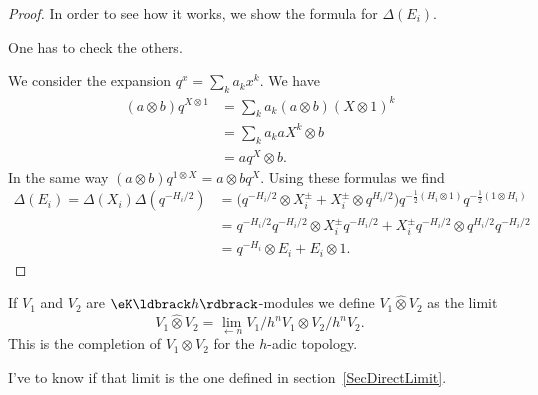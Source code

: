 \begin{proof}
	In order to see how it works, we show the formula for \( \Delta(E_i)\).
	\begin{probleme}
		One has to check the others.
	\end{probleme}
	We consider the expansion \( q^{x}=\sum_ka_kx^k\). We have
	\begin{subequations}
		\begin{align}
			(a\otimes b)q^{X\otimes 1} & =\sum_ka_k(a\otimes b)(X\otimes 1)^k \\
			                           & =\sum_k a_k aX^k\otimes b            \\
			                           & =aq^X\otimes b.
		\end{align}
	\end{subequations}
	In the same way \( (a\otimes b)q^{1\otimes X}=a\otimes bq^{X}\). Using these formulas we find
	\begin{subequations}
		\begin{align}
			\Delta(E_i)=\Delta(X_i)\Delta(q^{-H_i/2}) & =\big( q^{-H_i/2}\otimes X_i^{\pm}+X_i^{\pm}\otimes q^{H_i/2} \big)q^{-\frac{ 1 }{2}(H_i\otimes 1)}q^{-\frac{ 1 }{2}(1\otimes H_i)} \\
			                                          & =q^{-H_i/2}q^{-H_i/2}\otimes X_i^{\pm}q^{-H_i/2}+X_i^{\pm}q^{-H_i/2}\otimes q^{H_i/2}q^{-H_i/2}                                     \\
			                                          & =q^{-H_i}\otimes E_i+E_i\otimes 1.
		\end{align}
	\end{subequations}
\end{proof}

If \( V_1\) and \( V_2\) are \( \eK\ldbrack h\rdbrack\)-modules we define \( V_1\hat\otimes V_2\) as the limit
\begin{equation}
	V_1\hat\otimes V_2=\lim_{\leftarrow n}V_1/h^n V_1\otimes V_2/h^nV_2.
\end{equation}
This is the completion of \( V_1\otimes V_2\) for the \( h\)-adic topology.

\begin{probleme}
	I've to know if that limit is the one defined in section~\ref{SecDirectLimit}.
\end{probleme}

